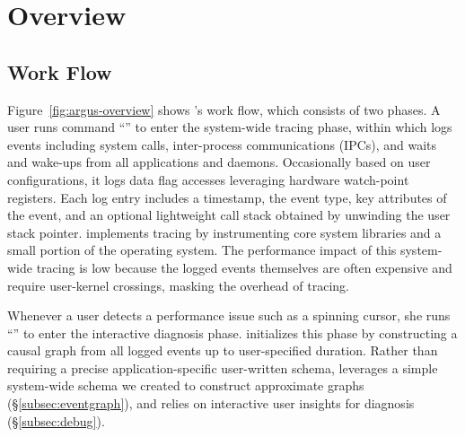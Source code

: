 \section{Overview} \label{sec:overview}

\subsection{\xxx Work Flow}

\begin{figure*}[tb]
    \centering
	
    \caption{\xxx Work Flow}
    \label{fig:argus-overview}
\end{figure*}

Figure~\ref{fig:argus-overview} shows \xxx's work flow, which consists of two
phases. A user runs command ``'' to enter the system-wide tracing
phase, within which \xxx logs events including system calls, inter-process
communications (IPCs), and waits and wake-ups from all applications and daemons.
Occasionally based on user configurations, it logs data flag accesses leveraging
hardware watch-point registers. Each log entry includes a timestamp, the event
type, key attributes of the event, and an optional lightweight call stack
obtained by unwinding the user stack pointer. \xxx implements tracing by
instrumenting core system libraries and a small portion of the operating system.
The performance impact of this system-wide tracing is low because the logged
events themselves are often expensive and require user-kernel crossings, masking
the overhead of tracing.

Whenever a user detects a performance issue such as a spinning cursor, she
runs ``'' to enter the interactive diagnosis phase. \xxx
initializes this phase by constructing a causal graph from all logged events up
to user-specified duration. Rather than requiring a precise application-specific
user-written schema, \xxx leverages a simple system-wide schema we created
to construct approximate graphs (\S\ref{subsec:eventgraph}), and relies on
interactive user insights for diagnosis (\S\ref{subsec:debug}).

